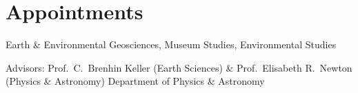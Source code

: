 \section{Appointments}

Earth \& Environmental Geosciences, Museum Studies, Environmental Studies


Advisors: Prof.~C.~Brenhin Keller (Earth Sciences) \& Prof.~Elisabeth R.~Newton (Physics \& Astronomy)
Department of Physics \& Astronomy



